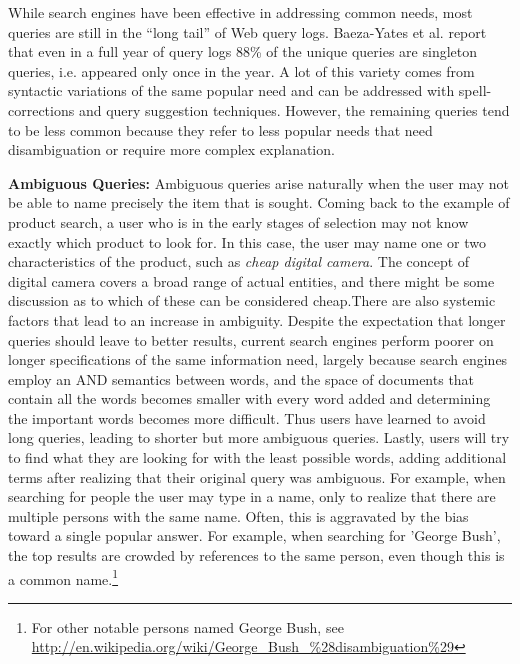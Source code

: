 While search engines have been effective in addressing common needs, most queries are still in the ``long tail'' of Web query logs. Baeza-Yates et al. report that even in a full year of query logs 88\% of the unique queries are singleton queries, i.e. appeared only once in the year. A lot of this variety comes from syntactic variations of the same popular need and can be addressed with spell-corrections and query suggestion techniques. However, the remaining queries tend to be less common because they refer to less popular needs that need disambiguation or require more complex explanation.

	\textbf{Ambiguous Queries:} 
	Ambiguous queries arise naturally when the user may not be able to name precisely the item that is sought. Coming back to the example of product search, a user who is in the early stages of selection may not know exactly which product to look for. In this case, the user may name one or two characteristics of the product, such as \emph{cheap digital camera}. The concept of digital camera covers a broad range of actual entities, and there might be some discussion as to which of these can be considered cheap.There are also systemic factors that lead to an increase in ambiguity. Despite the expectation that longer queries should leave to better results, current search engines perform poorer on longer specifications of the same information need, largely because search engines employ an AND semantics between words, and the space of documents that contain all the words becomes smaller with every word added and determining the important words becomes more difficult. Thus users have learned to avoid long queries, leading to shorter but more ambiguous queries. Lastly, users will try to find what they are looking for with the least possible words, adding additional terms after realizing that their original query was ambiguous. For example, when searching for people the user may type in a name, only to realize that there are multiple persons with the same name. Often, this is aggravated by the bias toward a single popular answer. For example, when searching for 'George Bush', the top results are crowded by references to the same person, even though this is a common name.\footnote{For other notable persons named George Bush, see \url{http://en.wikipedia.org/wiki/George_Bush_\%28disambiguation\%29}}
			
